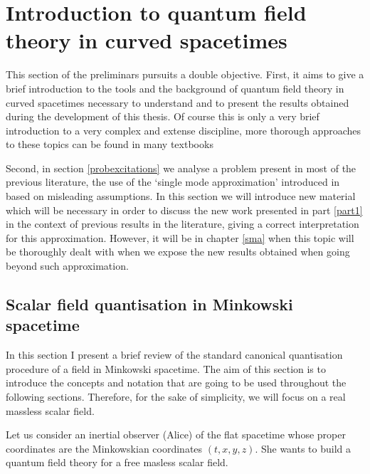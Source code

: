 


\chapter[Introduction to QFT in curved spacetimes]{Introduction to quantum field theory in curved spacetimes}\label{INTROU}

This  section of the preliminars pursuits a double objective. First, it aims to give a brief introduction to the tools and the background of quantum field theory in curved spacetimes necessary to understand and to present the results obtained during the development of this thesis. Of course this is only a very brief introduction to a very complex and extense discipline, more thorough approaches to these topics can be found in many textbooks \cite{Wald2,Birrell,NavarroSalas}

Second, in section \ref{probexcitations} we analyse a problem present in most of the previous literature, the use of the `single mode approximation' introduced in \cite{Alsingtelep,AlsingMcmhMil} based on misleading assumptions. In this section we will introduce new material which will be necessary in order to discuss the new work presented in part \ref{part1} in the context of previous results in the literature, giving a correct interpretation for this approximation. However, it will be in chapter \ref{sma} when this topic will be thoroughly dealt with when we expose the new results obtained when going beyond such approximation. 

\section{Scalar field quantisation in Minkowski \mbox{spacetime}}\label{scalarfieldq}

In this section I present a brief review of the standard canonical quantisation procedure of a field in Minkowski spacetime. The aim of this section is to introduce the concepts and notation that are going to be used throughout the following sections. Therefore, for the sake of simplicity, we will focus on a real massless scalar field. 

Let us consider an inertial observer (Alice) of the flat spacetime whose proper coordinates are the Minkowskian coordinates $(t,x, y, z)$. She wants to build a quantum field theory for a free masless scalar field. 

